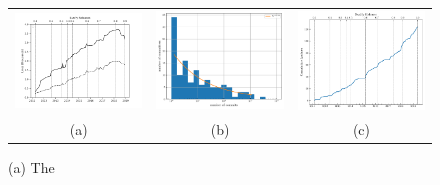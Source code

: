 \begin{figure}
\begin{tabular}{ccc}
  \includegraphics[width=45mm]{figures/sunpy_history.pdf} &
  \includegraphics[width=45mm]{figures/busfactor_plot.pdf} &   
  \includegraphics[width=45mm]{figures/cumulative_authors.pdf} \\
(a) & (b) & (c) \\
\end{tabular}
\caption{(a) The }
\label{fig:image2}
\end{figure}

